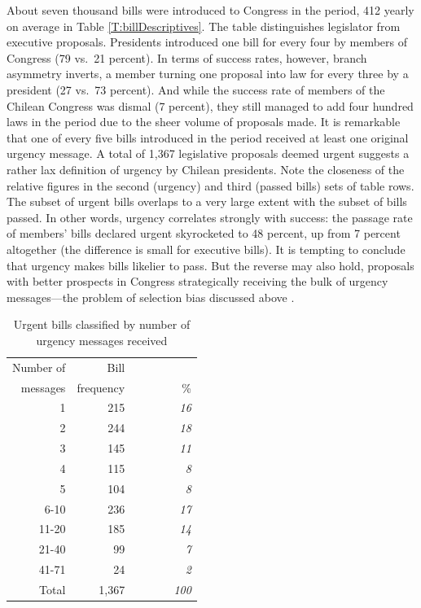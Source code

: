 \documentclass[letter,12pt]{article}
\begin{document}
About seven thousand bills were introduced to Congress in the period, 412 yearly on average in Table \ref{T:billDescriptives}. The table distinguishes legislator from executive proposals. Presidents introduced one bill for every four by members of Congress (79 vs.\ 21 percent). In terms of success rates, however, branch asymmetry inverts, a member turning one proposal into law for every three by a president (27 vs.\ 73 percent). And while the success rate of members of the Chilean Congress was dismal (7 percent), they still managed to add four hundred laws in the period due to the sheer volume of proposals made. It is remarkable that one of every five bills introduced in the period received at least one original urgency message. A total of 1,367 legislative proposals deemed urgent suggests a rather lax definition of urgency by Chilean presidents. Note the closeness of the relative figures in the second (urgency) and third (passed bills) sets of table rows. The subset of urgent bills overlaps to a very large extent with the subset of bills passed. In other words, urgency correlates strongly with success: the passage rate of members' bills declared urgent skyrocketed to 48 percent, up from 7 percent altogether (the difference is small for executive bills). It is tempting to conclude that urgency makes bills likelier to pass. But the reverse may also hold, proposals with better prospects in Congress strategically receiving the bulk of urgency messages---the problem of selection bias discussed above \citep[cf.][]{jacobson.kernell.1983}. 

\begin{table}
\begin{center}
\begin{tabular}{rrr}
Number of &      Bill &     \\
messages  & frequency &  ~~~~~~~~\% \\ \hline
1                 &  215      &  \emph{16}   \\
2                 &  244      &  \emph{18}   \\
3                 &  145      &  \emph{11}   \\
4                 &  115      &  \emph{8}    \\
5                 &  104      &  \emph{8}    \\
6-10              &  236      &  \emph{17}   \\
11-20             &  185      &  \emph{14}   \\
21-40             &  99       &  \emph{7}    \\
41-71             &  24       &  \emph{2}    \\
Total             & 1,367     & \emph{100}   \\ \hline
\end{tabular}
\caption{Urgent bills classified by number of urgency messages received}\label{T:billFreqByNurg}
\end{center}
\end{table}
\end{document}
